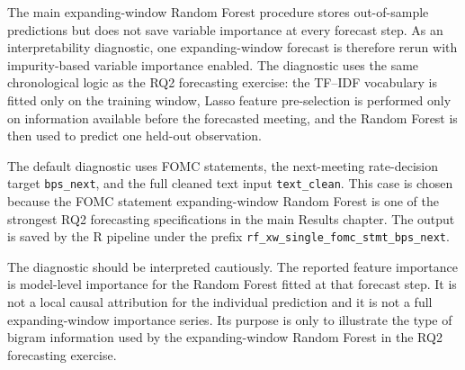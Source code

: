 The main expanding-window Random Forest procedure stores out-of-sample
predictions but does not save variable importance at every forecast step. As an
interpretability diagnostic, one expanding-window forecast is therefore rerun
with impurity-based variable importance enabled. The diagnostic uses the same
chronological logic as the RQ2 forecasting exercise: the TF--IDF vocabulary is
fitted only on the training window, Lasso feature pre-selection is performed
only on information available before the forecasted meeting, and the Random
Forest is then used to predict one held-out observation.

The default diagnostic uses FOMC statements, the next-meeting rate-decision
target \texttt{bps\_next}, and the full cleaned text input \texttt{text\_clean}.
This case is chosen because the FOMC statement expanding-window Random Forest
is one of the strongest RQ2 forecasting specifications in the main Results
chapter. The output is saved by the R pipeline under the prefix
\texttt{rf\_xw\_single\_fomc\_stmt\_bps\_next}.

The diagnostic should be interpreted cautiously. The reported feature
importance is model-level importance for the Random Forest fitted at that
forecast step. It is not a local causal attribution for the individual
prediction and it is not a full expanding-window importance series. Its purpose
is only to illustrate the type of bigram information used by the
expanding-window Random Forest in the RQ2 forecasting exercise.

